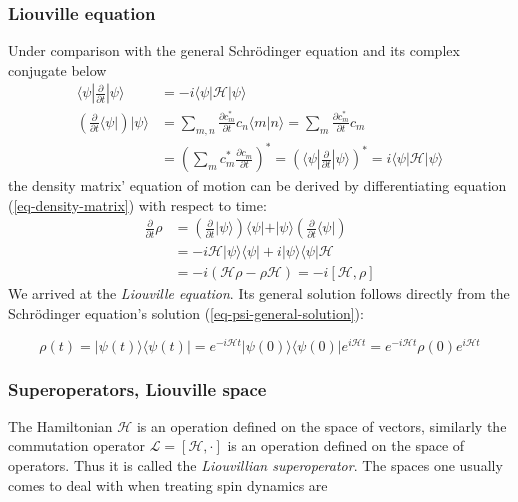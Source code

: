 \documentclass[11.5pt,a4paper]{article}
\begin{document}
\subsubsection{Liouville equation}
Under comparison with the general Schr\"odinger equation and its complex conjugate below
\begin{align}
 \langle \psi | \frac{\partial}{\partial t} |\psi\rangle  & = -i \langle \psi | \mathcal{H} |\psi\rangle \\
  \left( \frac{\partial}{\partial t} \langle \psi | \right)  |\psi\rangle
   & = \sum_{m,n} \frac{\partial c_m^*}{\partial t} c_n \langle m | n \rangle 
   =  \sum_{m} \frac{\partial c_m^*}{\partial t} c_m \\
   & = \left( \sum_{m} c_m^* \frac{\partial c_m}{\partial t}\right)^*
   = \left( \langle \psi | \frac{\partial}{\partial t} |\psi\rangle \right)^* = i \langle \psi |\mathcal{H} |\psi\rangle
\end{align}
the density matrix' equation of motion can be derived by differentiating equation (\ref{eq-density-matrix}) with respect to time:
\begin{align}
 \frac{\partial}{\partial t} \rho & = \left( \frac{\partial}{\partial t} | \psi \rangle \right) \langle \psi | + | \psi \rangle \left( \frac{\partial}{\partial t} \langle \psi | \right)  \\
  & = - i \mathcal{H} |\psi\rangle\langle\psi| + i |\psi\rangle\langle\psi| \mathcal{H}  \\
  & = -i ( \mathcal{H} \rho - \rho \mathcal{H} ) = -i [ \mathcal{H}, \rho ] 
  \label{eq-liouville}
\end{align}
We arrived at the \emph{Liouville equation}. Its general solution follows directly from the Schr\"odinger equation's solution (\ref{eq-psi-general-solution}):

\begin{equation}
 \rho(t) = |\psi(t)\rangle \langle \psi(t)| = e^{-i \mathcal{H} t} | \psi(0) \rangle \langle \psi(0) | e^{i \mathcal{H} t} = e^{-i \mathcal{H} t} \rho(0) e^{i \mathcal{H} t}
\end{equation}

\subsubsection{Superoperators, Liouville space}
The Hamiltonian $\mathcal{H}$ is an operation defined on the space of vectors, similarly the commutation operator $\mathcal{L} = [\mathcal{H}, \cdot ]$ is an operation defined on the space of operators. Thus it is called the \emph{Liouvillian superoperator}. The spaces one usually comes to deal with when treating spin dynamics are
\end{document}
